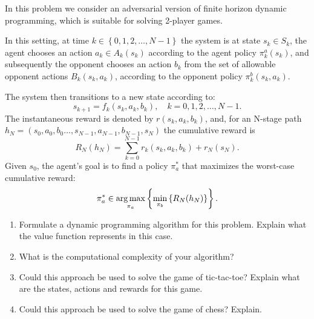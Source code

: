 \begin{exercise}
In this problem we consider an adversarial version of finite horizon dynamic programming, which is suitable for solving 2-player games. 

In this setting, at time $k \in \left\{ {0,1,2, \ldots ,N - 1} \right\}$ the system is at state ${s_k} \in {S_k}$, the agent chooses an action ${a_k} \in {A_k}\left( {{s_k}} \right)$ according to the agent policy $\pi _k^a({s_k})$, and subsequently the opponent chooses an action ${b_k}$ from the set of allowable opponent actions ${B_k}\left( {{s_k},{a_k}} \right)$, according to the opponent policy $\pi _k^b({s_k},{a_k})$.

The system then transitions to a new state according to:
$${s_{k + 1}} = {f_k}({s_k},{a_k},{b_k}),\quad k = 0,1,2, \ldots ,N - 1.$$
The instantaneous reward is denoted by $r\left( {{s_k},{a_k},{b_k}} \right)$, and, for an N-stage path ${h_N} = ({s_0},{a_0},{b_0} \ldots ,{s_{N - 1}},{a_{N - 1}},{b_{N - 1}},{s_N})$ the cumulative reward is
$${R_N}({h_N}) = \sum\limits_{k = 0}^{N - 1} {{r_k}({s_k},{a_k},{b_k}) + {r_N}({s_N})} .$$
Given ${s_0}$, the agent's goal is to find a policy $\pi _a^*$ that maximizes the worst-case cumulative reward:
$$\pi _a^* \in \argmax_{\pi_a} \left\{ {\min_{\pi_b}} \left\{{R_N}({h_N})\right\}\right\}.$$
\begin{enumerate}
  \item Formulate a dynamic programming algorithm for this problem. Explain what the value function represents in this case.
  \item What is the computational complexity of your algorithm?
  \item Could this approach be used to solve the game of tic-tac-toe? Explain what are the states, actions and rewards for this game.
  \item Could this approach be used to solve the game of chess? Explain.
\end{enumerate}
\end{exercise}

